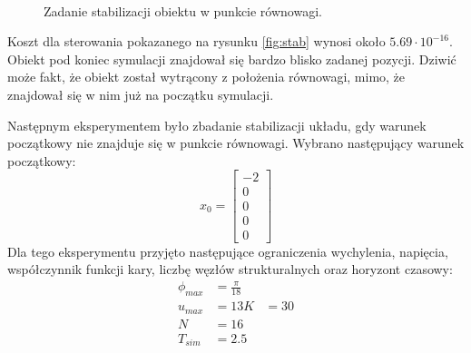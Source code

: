 \begin{figure}[H]
	~~
	\caption{Zadanie stabilizacji obiektu w punkcie równowagi.}
	\label{fig:equ}
\end{figure}

Koszt dla sterowania pokazanego na rysunku \ref{fig:stab} wynosi około \(5.69 \cdot 10^{-16}\). Obiekt pod koniec symulacji znajdował się bardzo blisko zadanej pozycji. Dziwić może fakt, że obiekt został wytrącony z położenia równowagi, mimo, że znajdował się w nim już na początku symulacji.

\newpage
Następnym eksperymentem było zbadanie stabilizacji układu, gdy warunek początkowy nie znajduje się w punkcie równowagi. Wybrano następujący warunek początkowy:
\begin{equation}
x_0=\begin{bmatrix}
-2\\
0\\
0\\
0\\
0
\end{bmatrix}
\end{equation}
Dla tego eksperymentu przyjęto następujące ograniczenia wychylenia, napięcia, współczynnik funkcji kary, liczbę węzłów strukturalnych oraz horyzont czasowy:
\begin{equation}
\begin{aligned}
\phi_{max}&=\frac{\pi}{18}\\
u_{max}&=13
K&=30\\
N&=16\\
T_{sim}&=2.5
\end{aligned}
\end{equation}

